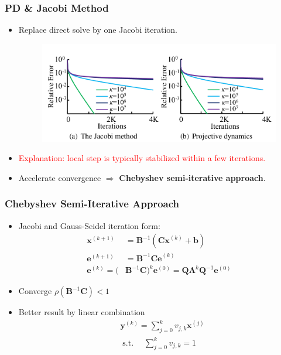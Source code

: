 \documentclass[serif,mathserif]{beamer}
\newcommand{\BOLD}[1]{\mathbf{#1}}
\newcommand{\BOLDG}[1]{\boldsymbol{#1}}
\newcommand{\TODO}[1]{\textcolor{red}{#1}}
\DeclareMathOperator{\ST}{s.t.}
\begin{document}
\begin{frame}
 \frametitle{PD \& Jacobi Method}
 \begin{itemize}
  \item Replace direct solve by one Jacobi iteration.
  \begin{figure}
   \centering
   \includegraphics[scale=0.25]{img/conv_comp}
  \end{figure}
  \item \TODO{Explanation: local step is typically stabilized within a few iterations.}
  \item Accelerate convergence $\Rightarrow$ \textbf{Chebyshev semi-iterative approach}.
 \end{itemize}
\end{frame}

\begin{frame}
  \frametitle{Chebyshev Semi-Iterative Approach}
  \begin{itemize}
   \item Jacobi and Gauss-Seidel iteration form:
   \begin{equation*}
   \begin{split}
    \BOLD{x}^{(k+1)} &= \BOLD{B}^{-1}(\BOLD{Cx}^{(k)}+\BOLD{b}) \\
    \BOLD{e}^{(k+1)} &= \BOLD{B}^{-1}\BOLD{Ce}^{(k)} \\
    \BOLD{e}^{(k)} = (&\BOLD{B}^{-1}\BOLD{C})^k\BOLD{e}^{(0)} = \BOLD{Q}\BOLDG{\Lambda}^k\BOLD{Q}^{-1}\BOLD{e}^{(0)}
   \end{split}
   \end{equation*}
  \item Converge $\rho(\BOLD{B}^{-1}\BOLD{C})<1$
  \item Better result by linear combination
  \begin{equation*}
  \begin{split}
   &\BOLD{y}^{(k)} = \sum_{j=0}^k v_{j, k}\BOLD{x}^{(j)} \\
   &\ST \quad \sum_{j=0}^k v_{j, k} = 1
  \end{split}
  \end{equation*}
  \end{itemize}
\end{frame}
\end{document}
